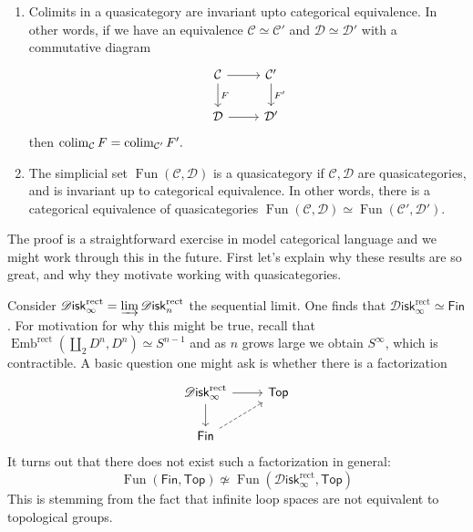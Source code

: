 \documentclass{amsart}
\DeclareMathOperator{\Fun}{Fun}
\DeclareMathOperator{\Emb}{Emb}
\newcommand{\Diskr}{\mathscr{D}\mathsf{isk}_n^\text{rect}}
\newcommand{\Diskir}{\mathscr{D}\mathsf{isk}_\infty^\text{rect}}
\begin{document}
\begin{theorem}
    \mbox{}
    \begin{enumerate}
        \item Colimits in a quasicategory are invariant upto categorical equivalence. In other words,
            if we have an equivalence $\mathcal{C}\simeq \mathcal{C}'$ and $\mathcal{D}\simeq \mathcal{D}'$
            with a commutative diagram
            \begin{equation*}
                \begin{tikzcd}
                    \mathcal{C} \rar\dar{F} &\mathcal{C}'\dar{F'}\\
                    \mathcal{D} \rar &\mathcal{D}'
                \end{tikzcd}
            \end{equation*}
            then $\operatorname*{colim}_\mathcal{C} F = \operatorname*{colim}_{\mathcal{C}'}F'.$
        \item The simplicial set $\Fun(\mathcal{C},\mathcal{D})$ is a quasicategory
            if $\mathcal{C},\mathcal{D}$ are quasicategories, and is invariant
            up to categorical equivalence. In other words, there is a categorical equivalence
            of quasicategories $\Fun(\mathcal{C},\mathcal{D})\simeq \Fun(\mathcal{C}',\mathcal{D}')$.
    \end{enumerate}
\end{theorem}

The proof is a straightforward exercise in model categorical language and we might
work through this in the future. First let's explain why these results are so great,
and why they motivate working with quasicategories.

Consider $\Diskir = \varinjlim\Diskr$ the sequential limit.
One finds that $\Diskir\simeq \mathsf{Fin}$.
For motivation for why this might be true, recall that
$\Emb^\text{rect}(\coprod_2 D^n,D^n)\simeq S^{n-1}$ and as $n$ grows large
we obtain $S^\infty$, which is contractible. A basic question one might ask
is whether there is a factorization
\begin{equation*}
    \begin{tikzcd}
        \Diskir \rar\dar & \mathsf{Top} \\
        \mathsf{Fin}\ar[ur,dashed]
    \end{tikzcd}
\end{equation*}
It turns out that there does not exist such a factorization in general:
\begin{equation*}
    \Fun(\mathsf{Fin},\mathsf{Top}) \not\simeq \Fun(\Diskir, \mathsf{Top})
\end{equation*}
This is stemming from the fact that infinite loop spaces are not equivalent to 
topological groups.
\end{document}
